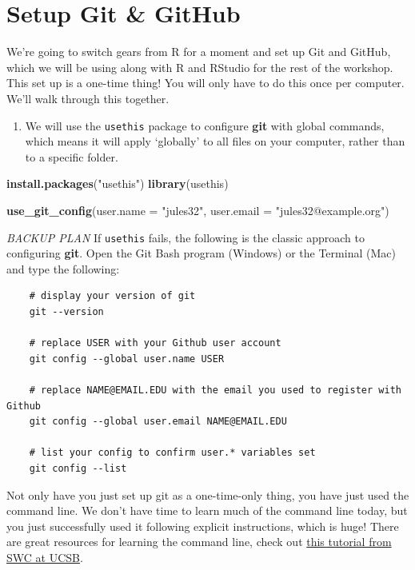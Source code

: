 \documentclass[]{book}
\newenvironment{Shaded}{\begin{snugshade}}{\end{snugshade}}
\newcommand{\DataTypeTok}[1]{\textcolor[rgb]{0.13,0.29,0.53}{#1}}
\newcommand{\KeywordTok}[1]{\textcolor[rgb]{0.13,0.29,0.53}{\textbf{#1}}}
\newcommand{\NormalTok}[1]{#1}
\newcommand{\StringTok}[1]{\textcolor[rgb]{0.31,0.60,0.02}{#1}}
\providecommand{\tightlist}{%
  \setlength{\itemsep}{0pt}\setlength{\parskip}{0pt}}
\begin{document}
\hypertarget{setup-git-github}{%
\section{Setup Git \& GitHub}\label{setup-git-github}}

We're going to switch gears from R for a moment and set up Git and GitHub, which we will be using along with R and RStudio for the rest of the workshop. This set up is a one-time thing! You will only have to do this once per computer. We'll walk through this together.

\begin{enumerate}
\def\labelenumi{\arabic{enumi}.}
\tightlist
\item
  We will use the \texttt{usethis} package to configure \textbf{git} with global commands, which means it will apply `globally' to all files on your computer, rather than to a specific folder.
\end{enumerate}

\begin{Shaded}
\begin{Highlighting}[]
\KeywordTok{install.packages}\NormalTok{(}\StringTok{"usethis"}\NormalTok{)}
\KeywordTok{library}\NormalTok{(usethis)}

\KeywordTok{use_git_config}\NormalTok{(}\DataTypeTok{user.name =} \StringTok{"jules32"}\NormalTok{, }\DataTypeTok{user.email =} \StringTok{"jules32@example.org"}\NormalTok{)}
\end{Highlighting}
\end{Shaded}

\emph{BACKUP PLAN} If \texttt{usethis} fails, the following is the classic approach to configuring \textbf{git}. Open the Git Bash program (Windows) or the Terminal (Mac) and type the following:

\begin{verbatim}
    # display your version of git
    git --version
    
    # replace USER with your Github user account
    git config --global user.name USER
    
    # replace NAME@EMAIL.EDU with the email you used to register with Github
    git config --global user.email NAME@EMAIL.EDU
    
    # list your config to confirm user.* variables set
    git config --list
\end{verbatim}

Not only have you just set up git as a one-time-only thing, you have just used the command line. We don't have time to learn much of the command line today, but you just successfully used it following explicit instructions, which is huge! There are great resources for learning the command line, check out \href{http://remi-daigle.github.io/2016-04-15-UCSB/shell/}{this tutorial from SWC at UCSB}.
\end{document}
